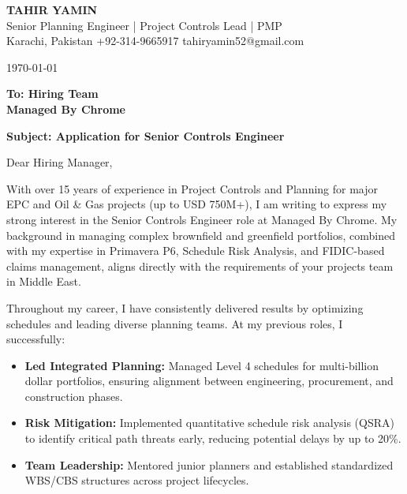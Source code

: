\documentclass[11pt,a4paper]{article}
\begin{document}
\begin{center}
    {\Huge \textbf{\color{awesome-darknight} TAHIR YAMIN}} \\[0.2cm]
    {\Large \color{awesome-gray} Senior Planning Engineer | Project Controls Lead | PMP} \\[0.3cm]
    
    \small \color{light-gray}
    Karachi, Pakistan \quad \textbullet \quad 
    +92-314-9665917 \quad \textbullet \quad 
    tahiryamin52@gmail.com
\end{center}

\vspace{0.8cm}
\today
\vspace{0.5cm}

\textbf{To: Hiring Team} \\
\textbf{Managed By Chrome} \\
\vspace{0.5cm}

\textbf{Subject: Application for Senior Controls Engineer}

\vspace{0.5cm}

Dear Hiring Manager,

With over 15 years of experience in Project Controls and Planning for major EPC and Oil \& Gas projects (up to USD 750M+), I am writing to express my strong interest in the Senior Controls Engineer role at Managed By Chrome. My background in managing complex brownfield and greenfield portfolios, combined with my expertise in Primavera P6, Schedule Risk Analysis, and FIDIC-based claims management, aligns directly with the requirements of your projects team in Middle East.

Throughout my career, I have consistently delivered results by optimizing schedules and leading diverse planning teams. At my previous roles, I successfully:

\begin{itemize}
    \item \textbf{Led Integrated Planning:} Managed Level 4 schedules for multi-billion dollar portfolios, ensuring alignment between engineering, procurement, and construction phases.
    \item \textbf{Risk Mitigation:} Implemented quantitative schedule risk analysis (QSRA) to identify critical path threats early, reducing potential delays by up to 20\%.
    \item \textbf{Team Leadership:} Mentored junior planners and established standardized WBS/CBS structures across project lifecycles.
\end{itemize}
\end{document}
